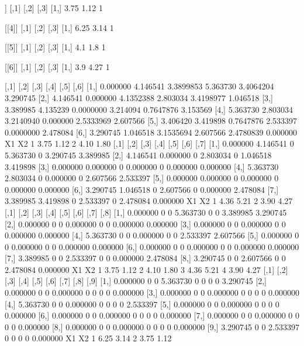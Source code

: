 \documentclass[parskip=full]{scrartcl}
\begin{document}
\begin{enumerate}
\begin{Schunk}
\begin{Soutput}
[[3]]
     [,1] [,2] [,3]
[1,] 3.75 1.12    1

[[4]]
     [,1] [,2] [,3]
[1,] 6.25 3.14    1

[[5]]
     [,1] [,2] [,3]
[1,]  4.1  1.8    1

[[6]]
     [,1] [,2] [,3]
[1,]  3.9 4.27    1

         [,1]     [,2]      [,3]     [,4]      [,5]     [,6]
[1,] 0.000000 4.146541 3.3899853 5.363730 3.4064204 3.290745
[2,] 4.146541 0.000000 4.1352388 2.803034 3.4198977 1.046518
[3,] 3.389985 4.135239 0.0000000 3.214094 0.7647876 3.153569
[4,] 5.363730 2.803034 3.2140940 0.000000 2.5333969 2.607566
[5,] 3.406420 3.419898 0.7647876 2.533397 0.0000000 2.478084
[6,] 3.290745 1.046518 3.1535694 2.607566 2.4780839 0.000000
    X1   X2
1 3.75 1.12
2 4.10 1.80
         [,1]     [,2] [,3]     [,4] [,5]     [,6]     [,7]
[1,] 0.000000 4.146541    0 5.363730    0 3.290745 3.389985
[2,] 4.146541 0.000000    0 2.803034    0 1.046518 3.419898
[3,] 0.000000 0.000000    0 0.000000    0 0.000000 0.000000
[4,] 5.363730 2.803034    0 0.000000    0 2.607566 2.533397
[5,] 0.000000 0.000000    0 0.000000    0 0.000000 0.000000
[6,] 3.290745 1.046518    0 2.607566    0 0.000000 2.478084
[7,] 3.389985 3.419898    0 2.533397    0 2.478084 0.000000
    X1   X2
1 4.36 5.21
2 3.90 4.27
         [,1] [,2] [,3]     [,4] [,5] [,6]     [,7]     [,8]
[1,] 0.000000    0    0 5.363730    0    0 3.389985 3.290745
[2,] 0.000000    0    0 0.000000    0    0 0.000000 0.000000
[3,] 0.000000    0    0 0.000000    0    0 0.000000 0.000000
[4,] 5.363730    0    0 0.000000    0    0 2.533397 2.607566
[5,] 0.000000    0    0 0.000000    0    0 0.000000 0.000000
[6,] 0.000000    0    0 0.000000    0    0 0.000000 0.000000
[7,] 3.389985    0    0 2.533397    0    0 0.000000 2.478084
[8,] 3.290745    0    0 2.607566    0    0 2.478084 0.000000
    X1   X2
1 3.75 1.12
2 4.10 1.80
3 4.36 5.21
4 3.90 4.27
          [,1] [,2] [,3]     [,4] [,5] [,6] [,7] [,8]     [,9]
 [1,] 0.000000    0    0 5.363730    0    0    0    0 3.290745
 [2,] 0.000000    0    0 0.000000    0    0    0    0 0.000000
 [3,] 0.000000    0    0 0.000000    0    0    0    0 0.000000
 [4,] 5.363730    0    0 0.000000    0    0    0    0 2.533397
 [5,] 0.000000    0    0 0.000000    0    0    0    0 0.000000
 [6,] 0.000000    0    0 0.000000    0    0    0    0 0.000000
 [7,] 0.000000    0    0 0.000000    0    0    0    0 0.000000
 [8,] 0.000000    0    0 0.000000    0    0    0    0 0.000000
 [9,] 3.290745    0    0 2.533397    0    0    0    0 0.000000
    X1   X2
1 6.25 3.14
2 3.75 1.12

\end{Soutput}
\end{Schunk}
\end{enumerate}
\end{document}
